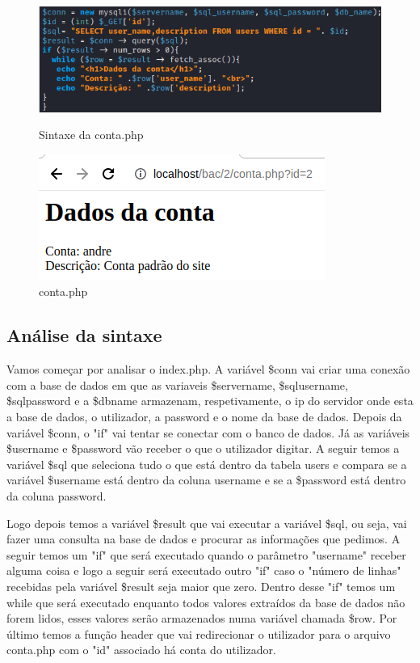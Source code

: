 \documentclass{report}
\begin{document}
\begin{figure}[!htb]
  \includegraphics[width=\linewidth]{imagescodebac/baccode2.png}
  \caption{Sintaxe da conta.php}\label{fig:conta.php}
\endminipage\hfill
{}
  \includegraphics[width=\linewidth]{imagesbac/bac2.png}
  \caption{conta.php}\label{fig:userinfo}
\endminipage
\end{figure}
\clearpage
\subsection{Análise da sintaxe}	
	
Vamos começar por analisar o index.php. A variável \$conn vai criar uma conexão com a base de dados em que as variaveis \$servername, \$sql\textunderscore username, \$sql\textunderscore password e a \$db\textunderscore name armazenam, respetivamente, o ip do servidor onde esta a base de dados, o utilizador, a password e o nome da base de dados. Depois da variável \$conn, o "if" vai tentar se conectar com o banco de dados. Já as variáveis \$username e \$password vão receber o que o utilizador digitar. A seguir temos a variável \$sql que seleciona tudo o que está dentro da tabela users e compara se a variável \$username está dentro da coluna user\textunderscore name e se a \$password está dentro da coluna password. 

Logo depois temos a variável \$result que vai executar a variável \$sql, ou seja, vai fazer uma consulta na base de dados e procurar as informações que pedimos. A seguir temos um "if" que será executado quando o parâmetro "username" receber alguma coisa e logo a seguir será executado outro "if" caso o "número de linhas" recebidas pela variável \$result seja maior que zero. Dentro desse "if" temos um while que será executado enquanto todos valores extraídos da base de dados não forem lidos, esses valores serão armazenados numa variável chamada \$row. Por último temos a função header que vai redirecionar o utilizador para o arquivo conta.php com o "id" associado há conta do utilizador.
\end{document}

